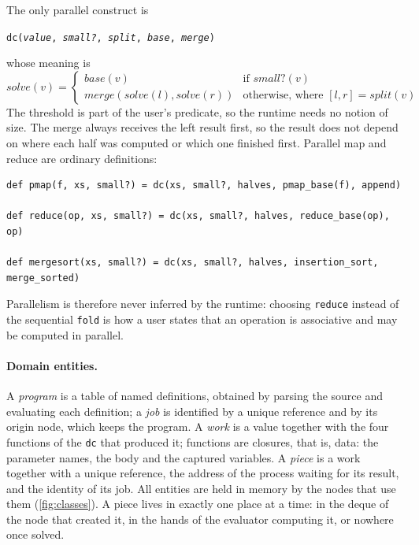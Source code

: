 \documentclass{scrartcl}
\begin{document}
The only parallel construct is
\begin{center}
\texttt{dc(\emph{value}, \emph{small?}, \emph{split}, \emph{base}, \emph{merge})}
\end{center}
whose meaning is
\[
\mathit{solve}(v) =
\begin{cases}
\mathit{base}(v) & \text{if } \mathit{small?}(v)\\
\mathit{merge}(\mathit{solve}(l), \mathit{solve}(r)) & \text{otherwise, where } [l, r] = \mathit{split}(v)
\end{cases}
\]
%
The threshold is part of the user's predicate, so the runtime needs no notion of size.
%
The merge always receives the left result first, so the result does not depend on where each half was computed or which one finished first.
%
Parallel map and reduce are ordinary definitions:
\begin{lstlisting}
def pmap(f, xs, small?) = dc(xs, small?, halves, pmap_base(f), append)

def reduce(op, xs, small?) = dc(xs, small?, halves, reduce_base(op), op)

def mergesort(xs, small?) = dc(xs, small?, halves, insertion_sort, merge_sorted)
\end{lstlisting}
%
Parallelism is therefore never inferred by the runtime: choosing \texttt{reduce} instead of the sequential \texttt{fold} is how a user states that an operation is associative and may be computed in parallel.

\paragraph{Domain entities.}
A \emph{program} is a table of named definitions, obtained by parsing the source and evaluating each definition; a \emph{job} is identified by a unique reference and by its origin node, which keeps the program.
%
A \emph{work} is a value together with the four functions of the \texttt{dc} that produced it; functions are closures, that is, data: the parameter names, the body and the captured variables.
%
A \emph{piece} is a work together with a unique reference, the address of the process waiting for its result, and the identity of its job.
%
All entities are held in memory by the nodes that use them (\cref{fig:classes}).
%
A piece lives in exactly one place at a time: in the deque of the node that created it, in the hands of the evaluator computing it, or nowhere once solved.
\end{document}
